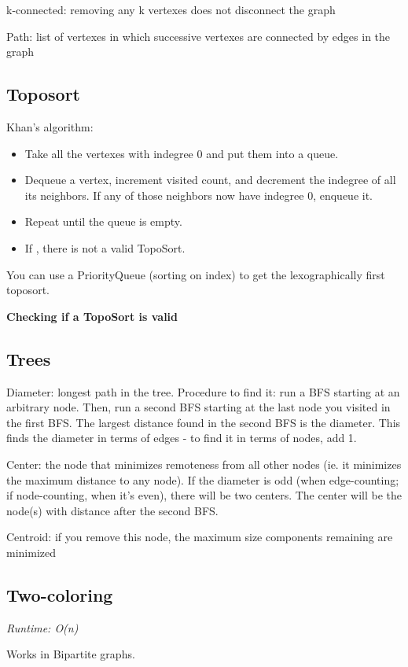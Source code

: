 k-connected: removing any k vertexes does not disconnect the graph

Path: list of vertexes in which successive vertexes are connected by edges in the graph

\subsection*{Toposort}

Khan's algorithm: 
\begin{itemize}
    \item Take all the vertexes with indegree 0 and put them into a queue.
    \item Dequeue a vertex, increment visited count, and decrement the indegree of all its neighbors. If any of those neighbors now have indegree 0, enqueue it.
    \item Repeat until the queue is empty.
    \item If , there is not a valid TopoSort.
\end{itemize}

You can use a PriorityQueue (sorting on index) to get the lexographically first toposort.

\textbf{Checking if a TopoSort is valid}



\subsection*{Trees}

Diameter: longest path in the tree. Procedure to find it: run a BFS starting at an arbitrary node. Then, run a second BFS starting at the last node you visited in the first BFS. The largest distance found in the second BFS is the diameter. This finds the diameter in terms of edges - to find it in terms of nodes, add 1.

Center: the node that minimizes remoteness from all other nodes (ie. it minimizes the maximum distance to any node). If the diameter is odd (when edge-counting; if node-counting, when it's even), there will be two centers. The center will be the node(s) with distance  after the second BFS.

Centroid: if you remove this node, the maximum size components remaining are minimized

\subsection*{Two-coloring}

\textit{Runtime: O(n)}

Works in Bipartite graphs.




\newpage